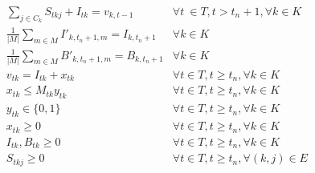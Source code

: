 \documentclass[10pt]{article}
\newcommand{\ti}{t} %
\newcommand{\ka}{k} %
\newcommand{\Ka}{K}
\newcommand{\jey}{j} %
\begin{document}
\begin{subequations}
\begin{flalign}
&  \sum_{j\in C_{k}} {S}_{\ti \ka \jey} + I_{\ti \ka} = v_{k,t-1} &\forall t \ \in T, t > t_{n}+1,\forall \ka \in \Ka  &     \label{eq:Det_inventory_ext}&\\
& \frac{1}{|M|} \sum_{m \in M} I'_{k,t_n+1,m} = I_{k,t_n+1} &\forall \ka \in \Ka & \label{eq:Average_Inventory} \\
& \frac{1}{|M|} \sum_{m \in M} B'_{k,t_n+1,m} = B_{k,t_n+1} &\forall \ka \in \Ka & \label{eq:Average_Backlog}\\
& v_{\ti \ka} = I_{\ti \ka} + x_{\ti \ka}  \quad &\forall t \in T, t \geq t_n,\forall \ka \in \Ka \\
&x_{\ti \ka} \leq M_{\ti \ka} y_{\ti \ka} &  \forall t  \in T , t \geq t_n  ,\forall \ka \in \Ka & \label{eq:Sub_FD_Setup}\\
&y_{\ti \ka} \in \{0, 1\} & \forall t  \in T,  t \geq t_n ,\forall\ka \in \Ka &\label{eq:Sub_FD_base_bin}\\
&x_{\ti \ka}  \geq 0 &  \forall t  \in T, t\geq t_n,\forall \ka \in \Ka  & \label{eq:Sub_FD_bound1}\\
& I_{\ti \ka} , B_{\ti \ka} \geq 0 &  \forall t  \in T,  t \geq t_n ,\forall \ka \in \Ka  & \label{eq:Sub_FD_bound2}\\
&S_{\ti \ka \jey} \geq 0 &  \forall t  \in T,  t \geq t_n , \forall(k,j) \in E  & \label{eq:Sub_FD_bound3}
\end{flalign}

  \end{subequations}
  
\end{document}
